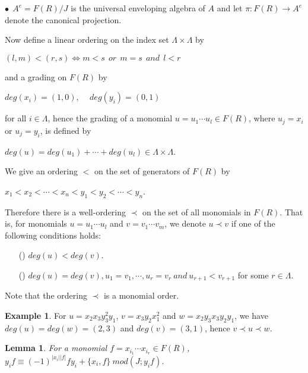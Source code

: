 \documentclass[a4paper,10pt]{amsart}
\newtheorem{lemma}[theorem]{Lemma}
\theoremstyle{definition}
\newtheorem{exa}[theorem]{Example}
\theoremstyle{remark}
\numberwithin{equation}{section}
\begin{document}
 $\bullet ~~A^e=F(R)/J$ is the universal enveloping algebra of $A$ and let $\pi: F(R)\rightarrow A^e$ denote the
 canonical projection.

Now define a linear ordering on the index set $\Lambda\times
\Lambda$ by
 \begin{center}
 $(l, m)<(r, s)\Longleftrightarrow m<s ~~or ~~m=s ~~and ~~l<r$
\end{center}
and a grading on $F(R)$ by
 \begin{center}
$deg(x_i)=(1, 0)$, ~~$deg(y_i)=(0, 1)$
\end{center}
for all $i\in \Lambda$, hence the grading of a monomial
$u=u_1\cdots u_l\in F(R)$, where $u_j=x_i$ or $u_j=y_i$, is defined by
 \begin{center}
 $deg(u)=deg(u_1)+\cdots+deg(u_l)\in \Lambda\times \Lambda$.
 \end{center}
We give an ordering $<$ on the set of generators of $F(R)$ by
 \begin{center}
 $x_1<x_2<\cdots<x_n<y_1<y_2<\cdots<y_n$.
 \end{center}
Therefore there is a well-ordering $\prec$ on the set of all
monomials in $F(R)$. That is, for monomials $u=u_1\cdots u_l$ and
$v=v_1\cdots v_m$, we denote $u\prec v$ if one of the following
conditions holds:
\begin{enumerate}
  \item[({\romannumeral {1}})] $deg(u)<deg(v)$.
  \item[({\romannumeral {2}})] $deg(u)=deg(v), u_1=v_1, \cdots, u_r=v_r ~and ~u_{r+1}<v_{r+1}$ for some $r\in
  \Lambda$.
\end{enumerate}
Note that the ordering $\prec$ is a monomial order.

\begin{exa}
For $u=x_2x_3y_3^2y_1$, $v=x_3y_2x_1^2$ and $w=x_2y_3x_3y_2y_1$, we
have $deg(u)=deg(w)=(2, 3)$ and $deg(v)=(3, 1)$, hence $v\prec
u\prec w$.
\end{exa}

\begin{lemma}\label{lem2}
For a monomial $f=x_{i_1}\cdots x_{i_r}\in F(R)$, $y_if\equiv
(-1)^{|x_i||f|}fy_i+\{x_i, f\} ~mod (J; y_if)$.
\end{lemma}
\end{document}

